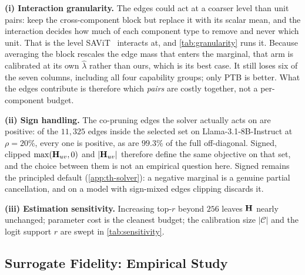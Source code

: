 \textbf{(i) Interaction granularity.} The edges could act at a coarser level than unit pairs: keep
the cross-component block but replace it with its scalar mean, and the interaction decides how much of
each component type to remove and never which unit. That is the level SAViT~\citep{zheng2022savit}
interacts at, and \cref{tab:granularity} runs it. Because averaging the block rescales the edge mass
that enters the marginal, that arm is calibrated at its own $\hat\lambda$ rather than ours, which is
its best case. It still loses six of the seven columns, including all four capability groups; only PTB
is better. What the edges contribute is therefore which \emph{pairs} are costly together, not a
per-component budget.

\begin{table}[htbp]
\centering\footnotesize
\caption{\textbf{Interaction granularity} (Llama-3.1-8B-Instruct, $\rho{=}20\%$). Both rows use the
same solver, guard and budget and differ only in whether the off-diagonal acts per unit pair or per
component pair; each is calibrated at its own $\hat\lambda$ ($0.0108$ and $0.0078$) and realises its
target ratio to within $0.2$ points. Bold is best in column.}
\label{tab:granularity}

\end{table}

\textbf{(ii) Sign handling.} The co-pruning edges the solver actually acts on are positive: of the
$11{,}325$ edges inside the selected set on Llama-3.1-8B-Instruct at $\rho{=}20\%$, every one is
positive, as are $99.3\%$ of the full off-diagonal. Signed, clipped $\max(\mathbf{H}_{uv},0)$ and
$|\mathbf{H}_{uv}|$ therefore define the same objective on that set, and the choice between them is not an
empirical question here. Signed remains the principled default (\cref{app:th-solver}): a negative
marginal is a genuine partial cancellation, and on a model with sign-mixed edges clipping discards
it.

\textbf{(iii) Estimation sensitivity.} Increasing top-$r$ beyond $256$ leaves $\mathbf{H}$ nearly unchanged;
parameter cost is the cleanest budget; the calibration size $|\mathcal{C}|$ and the logit support
$r$ are swept in \cref{tab:sensitivity}.


\subsection{Surrogate Fidelity: Empirical Study}

\label{app:surrogate}
